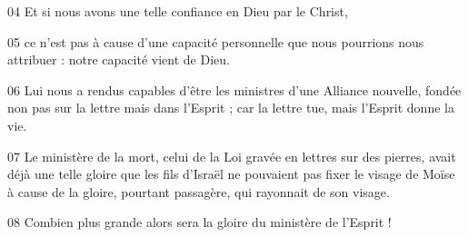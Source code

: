 
04 Et si nous avons une telle confiance en Dieu par le Christ,

05 ce n’est pas à cause d’une capacité personnelle que nous pourrions nous attribuer : notre capacité vient de Dieu.

06 Lui nous a rendus capables d’être les ministres d’une Alliance nouvelle, fondée non pas sur la lettre mais dans l’Esprit ; car la lettre tue, mais l’Esprit donne la vie.

07 Le ministère de la mort, celui de la Loi gravée en lettres sur des pierres, avait déjà une telle gloire que les fils d’Israël ne pouvaient pas fixer le visage de Moïse à cause de la gloire, pourtant passagère, qui rayonnait de son visage.

08 Combien plus grande alors sera la gloire du ministère de l’Esprit !
